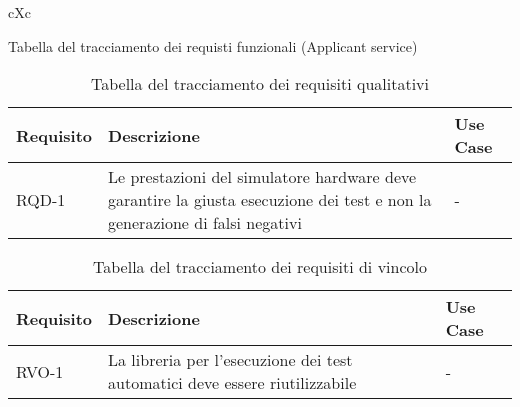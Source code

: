 \begin{table}[H]
\begin{paddedtablex}[1.4]{\textwidth}{cXc}

		\bottomrule
	\end{paddedtablex}
	\vspace{4pt}
	\caption{Tabella del tracciamento dei requisti funzionali (Applicant service)}
	\label{tab:requisiti-funzionali-a}
\end{table}%


\begin{table}[H]%
\caption{Tabella del tracciamento dei requisiti qualitativi}
\label{tab:requisiti-qualitativi}
\begin{tabularx}{\textwidth}{lXl}
\hline\hline
\textbf{Requisito} & \textbf{Descrizione} & \textbf{Use Case}\\
\hline
RQD-1    & Le prestazioni del simulatore hardware deve garantire la giusta esecuzione dei test e non la generazione di falsi negativi & - \\
\hline
\end{tabularx}
\end{table}%

\begin{table}[H]%
\caption{Tabella del tracciamento dei requisiti di vincolo}
\label{tab:requisiti-vincolo}
\begin{tabularx}{\textwidth}{lXl}
\hline\hline
\textbf{Requisito} & \textbf{Descrizione} & \textbf{Use Case}\\
\hline
RVO-1    & La libreria per l'esecuzione dei test automatici deve essere riutilizzabile & - \\
\hline
\end{tabularx}
\end{table}%